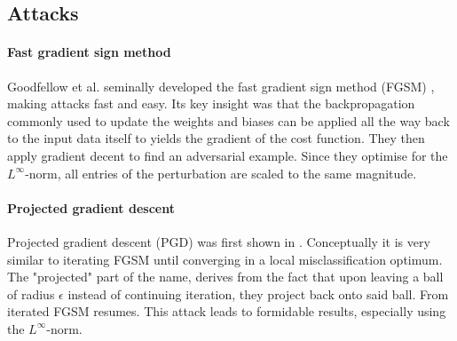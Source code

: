 \documentclass{article}
\newcommand{\defneq}{\mathrel{\mathop:}=}
\begin{document}
%
%
%
%
%

\subsection{Attacks}\label{sec:Attacks}

\paragraph{Fast gradient sign method}
Goodfellow et al. seminally developed the fast gradient sign method (FGSM) \cite{goodfellow2014explaining}, making attacks fast and easy. Its key insight was that the backpropagation commonly used to update the weights and biases can be applied all the way back to the input data itself to yields the gradient of the cost function. They then apply gradient decent to find an adversarial example. Since they optimise for the $L^\infty$-norm, all entries of the perturbation are scaled to the same magnitude.

\paragraph{Projected gradient descent}
Projected gradient descent (PGD) was first shown in \cite{madry2017towards}. Conceptually it is very similar to iterating FGSM until converging in a local misclassification optimum. The "projected" part of the name, derives from the fact that upon leaving a ball of radius $\epsilon$ instead of continuing iteration, they project back onto said ball. From iterated FGSM resumes.
This attack leads to formidable results, especially using the $L^\infty$-norm.
\end{document}
